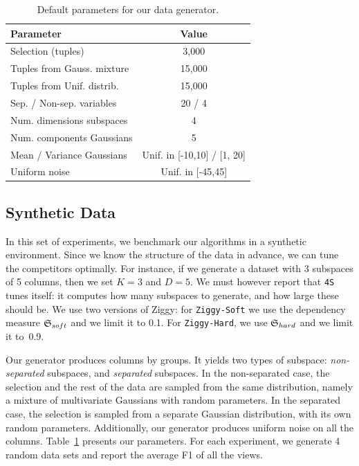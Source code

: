 \begin{table}[t!]
    \centering
    \small
    \begin{tabularx}{\columnwidth}{X  c }
      \hline
      Parameter & Value\\
      \hline
      Selection (tuples) & 3,000\\
      Tuples from Gauss. mixture & 15,000\\ 
      Tuples from Unif. distrib. & 15,000\\
      Sep. / Non-sep. variables & 20 / 4\\
      \hline
      Num. dimensions subspaces & 4\\
      Num. components Gaussians& 5\\
      Mean / Variance Gaussians & Unif. in [-10,10] / [1, 20]\\
      Uniform noise & Unif. in [-45,45]\\
      \hline
    \end{tabularx}
    \caption{Default parameters for our data generator.} 
\label{tab:synthparameters}
\end{table}

\subsection{Synthetic Data}
\label{sec:synthexp}


In this set of experiments, we benchmark our algorithms in a synthetic
environment. Since we know the structure of the data in advance, we can tune
the competitors optimally. For instance, if we generate a dataset with 3
subspaces of 5 columns, then we set $K=3$ and $D=5$. We must however report
that \texttt{4S} tunes itself: it computes how many subspaces to generate, and
how large these should be. We use two versions of Ziggy: for
\texttt{Ziggy-Soft} we use the dependency measure $\mathfrak{S}_{soft}$ and we limit
it to 0.1. For \texttt{Ziggy-Hard}, we use $\mathfrak{S}_{hard}$ and we limit it
to~0.9.

Our generator produces columns by groups. It
yields two types of subspace: \emph{non-separated} subspaces, and
\emph{separated} subspaces. In the non-separated case, the selection and the
rest of the data are sampled from the same distribution, namely a mixture of
multivariate Gaussians with random parameters. In the separated case, the
selection is sampled from a separate Gaussian distribution, with its own random
parameters. Additionally, our generator produces uniform noise on all the
columns. Table~\ref{tab:synthparameters} presents our parameters. For each
experiment, we generate 4 random data sets and report the average F1 of all the
views.

